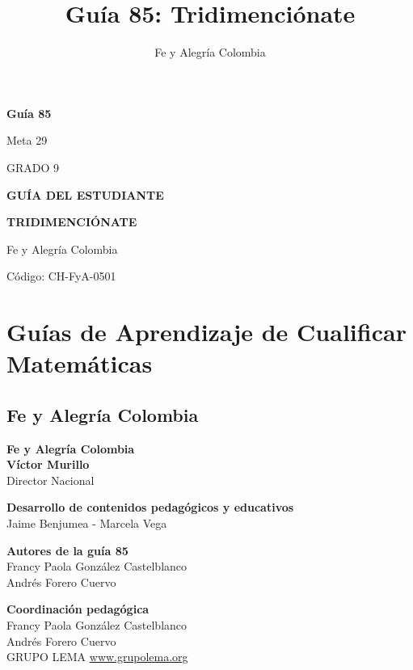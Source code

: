 \documentclass[12pt,a4paper]{article}
\title{\textbf{Guía 85: Tridimenciónate}}
\author{Fe y Alegría Colombia}
\date{}
\begin{document}
\begin{titlepage}
    \centering
    \vspace*{2cm}

    {\Huge\bfseries Guía 85\par}
    \vspace{0.5cm}
    {\Large Meta 29\par}
    \vspace{0.3cm}
    {\Large GRADO 9\par}
    \vspace{1cm}

    {\LARGE\bfseries GUÍA DEL ESTUDIANTE\par}
    \vspace{1cm}

    {\Huge\bfseries TRIDIMENCIÓNATE\par}
    \vspace{2cm}

    \vfill

    {\large Fe y Alegría Colombia\par}
    {\large Código: CH-FyA-0501\par}
\end{titlepage}

\newpage

\section*{Guías de Aprendizaje de Cualificar Matemáticas}
\subsection*{Fe y Alegría Colombia}

\textbf{Fe y Alegría Colombia}\\
\textbf{Víctor Murillo}\\
Director Nacional

\textbf{Desarrollo de contenidos pedagógicos y educativos}\\
Jaime Benjumea - Marcela Vega

\textbf{Autores de la guía 85}\\
Francy Paola González Castelblanco\\
Andrés Forero Cuervo

\textbf{Coordinación pedagógica}\\
Francy Paola González Castelblanco\\
Andrés Forero Cuervo\\
GRUPO LEMA \url{www.grupolema.org}
\end{document}
